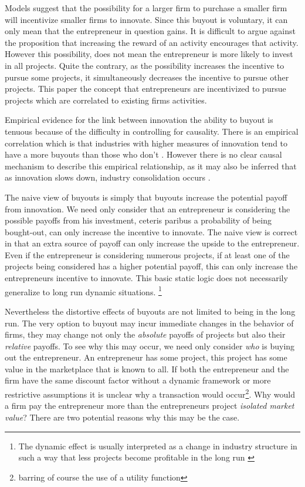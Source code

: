 \documentclass[11pt]{article}
\begin{document}
Models suggest that the possibility for a larger firm to purchase a smaller firm will incentivize smaller firms to innovate. Since this buyout is voluntary, it can only mean that the entrepreneur in question gains. It is difficult to argue against the proposition that increasing the reward of an activity encourages that activity. However this possibility, does not mean the entrepreneur is more likely to invest in all projects. Quite the contrary, as the possibility increases the incentive to pursue some projects, it simultaneously decreases the incentive to pursue other projects. This paper the concept that entrepreneurs are incentivized to pursue projects which are correlated to existing firms activities.


Empirical evidence for the link between innovation the ability to buyout is tenuous because of the difficulty in controlling for causality. There is an empirical correlation which is that industries with higher measures of innovation tend to have a more buyouts than those who don't \citep{HAU}. However there is no clear causal mechanism to describe this empirical relationship, as it may also be inferred that as innovation slows down, industry consolidation occurs \citep{COM}. 

The naive view of buyouts is simply that buyouts increase the potential payoff from innovation. We need only consider that an entrepreneur is considering the possible payoffs from his investment, ceteris paribus a probability of being bought-out, can only increase the incentive to innovate. The naive view is correct in that an extra source of payoff can only increase the upside to the entrepreneur. Even if the entrepreneur is considering numerous projects, if at least one of the projects being considered has a higher potential payoff, this can only increase the entrepreneurs incentive to innovate. This basic static logic does not necessarily generalize to long run dynamic situations. \footnote{The dynamic effect is usually interpreted as a change in industry structure in such a way that less projects become profitable in the long run \cite{bessen_maskin}}

Nevertheless the distortive effects of buyouts are not limited to being in the long run. The very option to buyout may incur immediate changes in the behavior of firms, they may change not only the \textit{absolute} payoffs of projects but also their \textit{relative} payoffs. To see why this may occur, we need only consider \textit{who} is buying out the entrepreneur. An entrepreneur has some project, this project has some value in the marketplace that is known to all. If both the entrepreneur and the firm have the same discount factor without a dynamic framework or more restrictive assumptions it is unclear why a transaction would occur\footnote{barring of course the use of a utility function}. Why would a firm pay the entrepreneur more than the entrepreneurs project \textit{isolated market value}?  There are two potential reasons why this may be the case.
\end{document}
